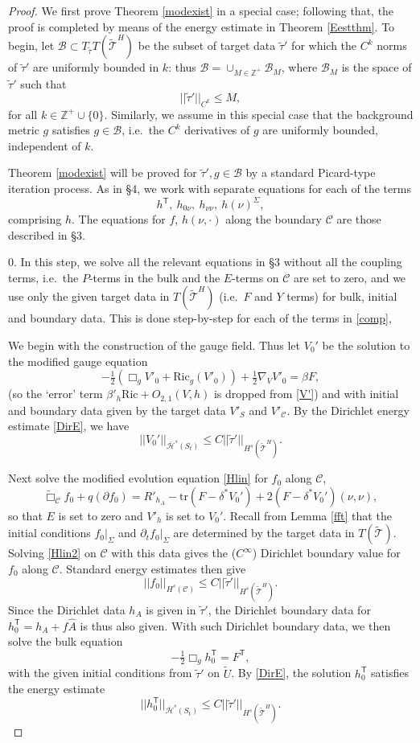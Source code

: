 \documentclass[10pt]{amsart}
\renewcommand{\b}{\beta}
\renewcommand{\d}{\delta}
\newcommand{\Si}{\Sigma}
\newcommand{\cC}{{\mathcal C}}
\newcommand{\cT}{{\mathcal T}}
\newcommand{\cB}{{\mathcal B}}
\newcommand{\cH}{{\mathcal H}}
\newcommand{\bZ}{\mathbb Z}
\newcommand{\Ric}{\mathrm{Ric}}
\newcommand{\tT}{\mathsf{T}}
\newcommand{\be}{\begin{equation}}
\newcommand{\ee}{\end{equation}}
\newcommand{\tr}{\mathrm{tr}}
\newcommand{\p}{\partial}
\renewcommand{\hat}{\widehat}
\newcommand{\<}{\langle}
\renewcommand{\>}{\rangle}
\newcommand{\w}{\widetilde}
\theoremstyle{plain}
\theoremstyle{remark}
\theoremstyle{definition}
\numberwithin{equation}{section}
\begin{document}
 \begin{proof} 


  We first prove Theorem \ref{modexist} in a special case; following that, the proof is completed by means of the energy estimate in Theorem \ref{Eestthm}. 
 To begin, let $\cB \subset T_{\w \tau}T(\w \cT^H)$ be the subset of target data $\w \tau'$ for which the $C^k$ norms of $\w \tau'$ are uniformly bounded in $k$: thus 
$\cB = \cup_{M\in \bZ^+} \cB_M$, where $\cB_M$ is the space of $\w \tau'$ such that 
\be \label{Mbound}
||\w \tau'||_{C^k} \leq M,
\ee
for all $k \in \bZ^+ \cup \{0\}$. Similarly, we assume in this special case that the background metric $g$ satisfies $g \in \cB$, i.e.~the $C^k$ derivatives 
of $g$ are uniformly bounded, independent of $k$. 

   Theorem \ref{modexist} will be proved for $\w \tau', g \in \cB$ by a standard Picard-type iteration process. As in \S 4, we work with separate equations 
for each of the terms 
\be \label{comp}
h^{\tT}, \ h_{0\nu}, \ h_{\nu \nu}, \ h(\nu)^{\Si},
\ee
comprising $h$. The equations for $f$, $h(\nu, \cdot)$ along the boundary $\cC$ are those described in \S 3. 

  
\medskip 


0. In this step, we solve all the relevant equations in \S 3 without all the coupling terms, i.e.~the $P$-terms in the bulk and the $E$-terms on $\cC$ are 
set to zero, and we use only the given target data in $T(\w \cT^H)$ (i.e.~$F$ and $Y$ terms) for bulk, initial and boundary data. This is done step-by-step 
for each of the terms in \eqref{comp}, 

  We begin with the construction of the gauge field. Thus let $V_0'$ be the solution to the modified gauge equation 
\be \label{modV'}
-\tfrac{1}{2}(\Box_g V'_0+ \Ric_g (V'_0)) + \tfrac{1}{2}\nabla_{V} V'_0 = \b F,
\ee
(so the `error' term $\b'_h \Ric + O_{2,1}(V,h)$ is dropped from \eqref{V'}) and with initial and boundary data given by the target data $V'_S$ and $V'_{\cC}$.  
By the Dirichlet energy estimate \eqref{DirE}, we have 
$$||V_0'||_{\bar \cH^s(S_t)} \leq C||\w \tau'||_{H^s(\w \cT^H)}.$$

  Next solve the modified evolution equation \eqref{Hlin} for $f_0$ along $\cC$, 
\be \label{Hlin2} 
\w \Box_\cC f _0 + q(\p f_0) = R'_{h_A} - \tr(F-\d^* V_0') + 2(F-\d^* V_0')(\nu,\nu),
\ee
so that $E$ is set to zero and $V'_h$ is set to $V_0'$. Recall from Lemma \ref{fft} that the initial conditions $f_0 |_{\Si}$ and $\p_t f_0 |_{\Si}$ are determined 
by the target data in $T(\w \cT)$. Solving \eqref{Hlin2} on $\cC$ with this data gives the ($C^{\infty}$) Dirichlet boundary value for $f_0$ along 
$\cC$. Standard energy estimates then give 
$$||f_0||_{H^s(\cC)} \leq C||\w \tau'||_{H^s(\w \cT^H)}.$$
Since the Dirichlet data $h_A$ is given in $\w \tau'$, the Dirichlet boundary data for $h_0^{\tT} = h_A + f\hat A$ is thus also given. 
With such Dirichlet boundary data, we then solve the bulk equation 
\be \label{hT0}
-\tfrac{1}{2}\Box_g h_0^{\tT}   = F^{\tT}, 
\ee
with the given initial conditions from $\w \tau'$ on $\w U$. By \eqref{DirE}, the solution $h_0^{\tT}$ satisfies the energy estimate 
\be \label{H0Test}
||h_0^{\tT}||_{\bar \cH^s(S_t)} \leq C||\w \tau'||_{H^s(\w \cT^H)}.
\ee


\end{proof}
\end{document}
